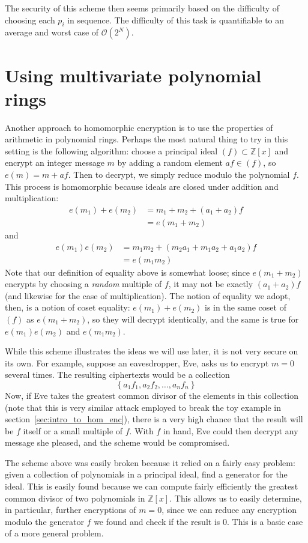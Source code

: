 \documentclass[11pt]{report}
\newcommand{\Zx}{\mathbb{Z}[x]}
\newcommand{\bigO}{\mathcal{O}}
\begin{document}
The security of this scheme then seems primarily based on the difficulty of choosing each $p_i$ in sequence. The difficulty of this task is quantifiable to an average and worst case of $\bigO(2^{N})$.

\section{Using multivariate polynomial rings}
\label{sec:multicrypt}

Another approach to homomorphic encryption is to use the properties of arithmetic in polynomial rings. Perhaps the most natural thing to try in this setting is the following algorithm: choose a principal ideal $(f)\subset \Zx$ and encrypt an integer message $m$ by adding a random element $af\in (f)$, so $e(m) = m+af$. Then to decrypt, we simply reduce modulo the polynomial $f$. This process is homomorphic because ideals are closed under addition and multiplication:
\begin{align*}
e(m_1)+e(m_2) &= m_1+m_2+(a_1+a_2)f\\
&= e(m_1+m_2)
\end{align*}
and
\begin{align*}
e(m_1)e(m_2) &= m_1m_2+(m_2a_1+m_1a_2+a_1a_2)f\\
&= e(m_1m_2)
\end{align*}
Note that our definition of equality above is somewhat loose; since $e(m_1+m_2)$ encrypts by choosing a \emph{random} multiple of $f$, it may not be exactly $(a_1+a_2)f$ (and likewise for the case of multiplication). The notion of equality we adopt, then, is a notion of coset equality: $e(m_1)+e(m_2)$ is in the same coset of $(f)$ as $e(m_1+m_2)$, so they will decrypt identically, and the same is true for $e(m_1)e(m_2)$ and $e(m_1m_2)$.

While this scheme illustrates the ideas we will use later, it is not very secure on its own. For example, suppose an eavesdropper, Eve, asks us to encrypt $m=0$ several times. The resulting ciphertexts would be a collection
\[\left\{ a_1f_1, a_2f_2,\dots ,a_nf_n\right\}\]
Now, if Eve takes the greatest common divisor of the elements in this collection (note that this is very similar attack employed to break the toy example in section~\ref{sec:intro_to_hom_enc}), there is a very high chance that the result will be $f$ itself or a small multiple of $f$. With $f$ in hand, Eve could then decrypt any message she pleased, and the scheme would be compromised.

The scheme above was easily broken because it relied on a fairly easy problem: given a collection of polynomials in a principal ideal, find a generator for the ideal. This is easily found because we can compute fairly efficiently the greatest common divisor of two polynomials in $\Zx$. This allows us to easily determine, in particular, further encryptions of $m=0$, since we can reduce any encryption modulo the generator $f$ we found and check if the result is $0$. This is a basic case of a more general problem. 
\end{document}
